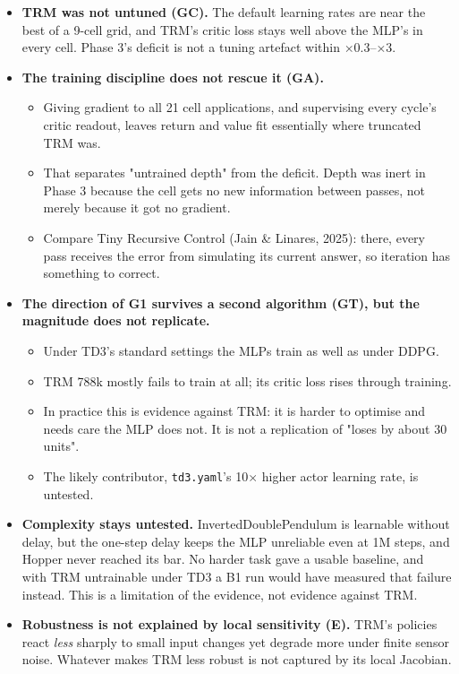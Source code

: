 \documentclass[11pt]{article}
\begin{document}
\begin{itemize}
\item \textbf{TRM was not untuned (GC).} The default learning rates are near the best of a 9-cell grid, and TRM's critic loss stays well above the MLP's in every cell. Phase 3's deficit is not a tuning artefact within $\times$0.3--$\times$3.
\item \textbf{The training discipline does not rescue it (GA).}
\begin{itemize}
\item Giving gradient to all 21 cell applications, and supervising every cycle's critic readout, leaves return and value fit essentially where truncated TRM was.
\item That separates "untrained depth" from the deficit. Depth was inert in Phase 3 because the cell gets no new information between passes, not merely because it got no gradient.
\item Compare Tiny Recursive Control (Jain \& Linares, 2025): there, every pass receives the error from simulating its current answer, so iteration has something to correct.
\end{itemize}
\item \textbf{The direction of G1 survives a second algorithm (GT), but the magnitude does not replicate.}
\begin{itemize}
\item Under TD3's standard settings the MLPs train as well as under DDPG.
\item TRM 788k mostly fails to train at all; its critic loss rises through training.
\item In practice this is evidence against TRM: it is harder to optimise and needs care the MLP does not. It is not a replication of "loses by about 30 units".
\item The likely contributor, \texttt{td3.yaml}'s 10$\times$ higher actor learning rate, is untested.
\end{itemize}
\item \textbf{Complexity stays untested.} InvertedDoublePendulum is learnable without delay, but the one-step delay keeps the MLP unreliable even at 1M steps, and Hopper never reached its bar. No harder task gave a usable baseline, and with TRM untrainable under TD3 a B1 run would have measured that failure instead. This is a limitation of the evidence, not evidence against TRM.
\item \textbf{Robustness is not explained by local sensitivity (E).} TRM's policies react \emph{less} sharply to small input changes yet degrade more under finite sensor noise. Whatever makes TRM less robust is not captured by its local Jacobian.
\end{itemize}
\end{document}
